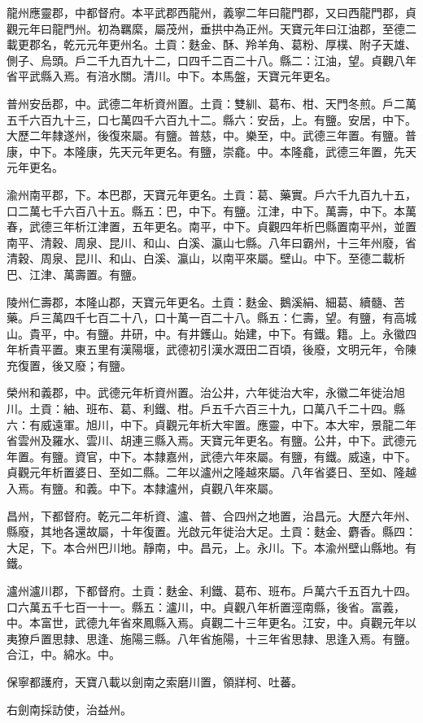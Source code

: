 \begin{pinyinscope}
 龍州應靈郡，中都督府。本平武郡西龍州，義寧二年曰龍門郡，又曰西龍門郡，貞觀元年曰龍門州。初為羈縻，屬茂州，垂拱中為正州。天寶元年曰江油郡，至德二載更郡名，乾元元年更州名。土貢：麩金、酥、羚羊角、葛粉、厚樸、附子天雄、側子、烏頭。戶二千九百九十二，口四千二百二十八。縣二：江油，望。貞觀八年省平武縣入焉。有涪水關。清川。中下。本馬盤，天寶元年更名。



 普州安岳郡，中。武德二年析資州置。土貢：雙紃、葛布、柑、天門冬煎。戶二萬五千六百九十三，口七萬四千六百九十二。縣六：安岳，上。有鹽。安居，中下。大歷二年隸遂州，後復來屬。有鹽。普慈，中。樂至，中。武德三年置。有鹽。普康，中下。本隆康，先天元年更名。有鹽，崇龕。中。本隆龕，武德三年置，先天元年更名。



 渝州南平郡，下。本巴郡，天寶元年更名。土貢：葛、藥實。戶六千九百九十五，口二萬七千六百八十五。縣五：巴，中下。有鹽。江津，中下。萬壽，中下。本萬春，武德三年析江津置，五年更名。南平，中下。貞觀四年析巴縣置南平州，並置南平、清穀、周泉、昆川、和山、白溪、瀛山七縣。八年曰霸州，十三年州廢，省清穀、周泉、昆川、和山、白溪、瀛山，以南平來屬。壁山。中下。至德二載析巴、江津、萬壽置。有鹽。



 陵州仁壽郡，本隆山郡，天寶元年更名。土貢：麩金、鵝溪絹、細葛、續髓、苦藥。戶三萬四千七百二十八，口十萬一百二十八。縣五：仁壽，望。有鹽，有高城山。貴平，中。有鹽。井研，中。有井鑊山。始建，中下。有鐵。籍。上。永徽四年析貴平置。東五里有漢陽堰，武德初引漢水溉田二百頃，後廢，文明元年，令陳充復置，後又廢；有鹽。



 榮州和義郡，中。武德元年析資州置。治公井，六年徙治大牢，永徽二年徙治旭川。土貢：紬、班布、葛、利鐵、柑。戶五千六百三十九，口萬八千二十四。縣六：有威遠軍。旭川，中下。貞觀元年析大牢置。應靈，中下。本大牢，景龍二年省雲州及羅水、雲川、胡連三縣入焉。天寶元年更名。有鹽。公井，中下。武德元年置。有鹽。資官，中下。本隸嘉州，武德六年來屬。有鹽，有鐵。威遠，中下。貞觀元年析置婆日、至如二縣。二年以瀘州之隆越來屬。八年省婆日、至如、隆越入焉。有鹽。和義。中下。本隸瀘州，貞觀八年來屬。



 昌州，下都督府。乾元二年析資、瀘、普、合四州之地置，治昌元。大歷六年州、縣廢，其地各還故屬，十年復置。光啟元年徙治大足。土貢：麩金、麝香。縣四：大足，下。本合州巴川地。靜南，中。昌元，上。永川。下。本渝州壁山縣地。有鐵。



 瀘州瀘川郡，下都督府。土貢：麩金、利鐵、葛布、班布。戶萬六千五百九十四。口六萬五千七百一十一。縣五：瀘川，中。貞觀八年析置涇南縣，後省。富義，中。本富世，武德九年省來鳳縣入焉。貞觀二十三年更名。江安，中。貞觀元年以夷獠戶置思隸、思逢、施陽三縣。八年省施陽，十三年省思隸、思逢入焉。有鹽。合江，中。綿水。中。



 保寧都護府，天寶八載以劍南之索磨川置，領牂柯、吐蕃。



 右劍南採訪使，治益州。



\end{pinyinscope}